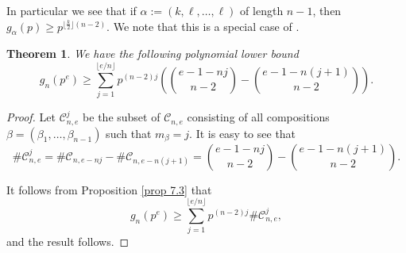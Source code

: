 \documentclass[a4paper]{amsart}
\newtheorem{theorem}{Theorem}[section]
\numberwithin{equation}{section}
\theoremstyle{remark}
\begin{document}
In particular we see that if $\alpha := (k,\ell,\dots,\ell)$ of length $n-1$, then $g_{\alpha}(p) \geq p^{{\lfloor\frac{k}{2}\rfloor}(n-2)}$. We note that this is a special case of \cite[Corollary 4.6]{ishamlowerbound}. 
\begin{theorem}
    We have the following polynomial lower bound 
    \[g_n(p^e)\geq \sum_{j=1}^{\lfloor e/n\rfloor} p^{(n-2)j}\left( \binom{e-1-nj}{n-2}-\binom{e-1-n(j+1)}{n-2}\right).\]
\end{theorem}
\begin{proof}
Let $\mathcal{C}_{n,e}^{j}$ be the subset of $\mathcal{C}_{n,e}$ consisting of all compositions $\beta=(\beta_1, \dots, \beta_{n-1})$ such that $m_\beta=j$. It is easy to see that 
\[\#\mathcal{C}_{n,e}^j=\# \mathcal{C}_{n, e-nj}-\# \mathcal{C}_{n, e-n(j+1)}=\binom{e-1-nj}{n-2}-\binom{e-1-n(j+1)}{n-2}.\]

It follows from Proposition \ref{prop 7.3} that
\[g_n(p^e)\geq \sum_{j=1}^{\lfloor e/n\rfloor} p^{(n-2)j} \# \mathcal{C}_{n,e}^j,\]and the result follows.
\end{proof}
\end{document}

